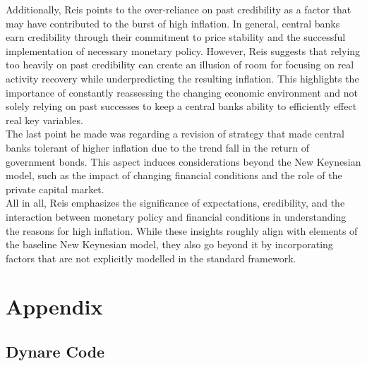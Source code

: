 \documentclass[a4paper,11pt]{article}
\begin{document}
Additionally, Reis points to the over-reliance on past credibility as a factor that may have contributed to the burst of high inflation. In general, central banks earn credibility through their commitment to price stability and the successful implementation of necessary monetary policy. However, Reis suggests that relying too heavily on past credibility can create an illusion of room for focusing on real activity recovery while underpredicting the resulting inflation. This highlights the importance of constantly reassessing the changing economic environment and not solely relying on past successes to keep a central banks ability to efficiently effect real key variables. \\

The last point he made was regarding a revision of strategy that made central banks tolerant of higher inflation due to the trend fall in the return of government bonds. This aspect induces considerations beyond the New Keynesian model, such as the impact of changing financial conditions and the role of the private capital market. \\

All in all, Reis emphasizes the significance of expectations, credibility, and the interaction between monetary policy and financial conditions in understanding the reasons for high inflation. While these insights roughly align with elements of the baseline New Keynesian model, they also go beyond it by incorporating factors that are not explicitly modelled in the standard framework. \\
 
\pagebreak

\section{Appendix}
\subsection{Dynare Code}

\end{document}
